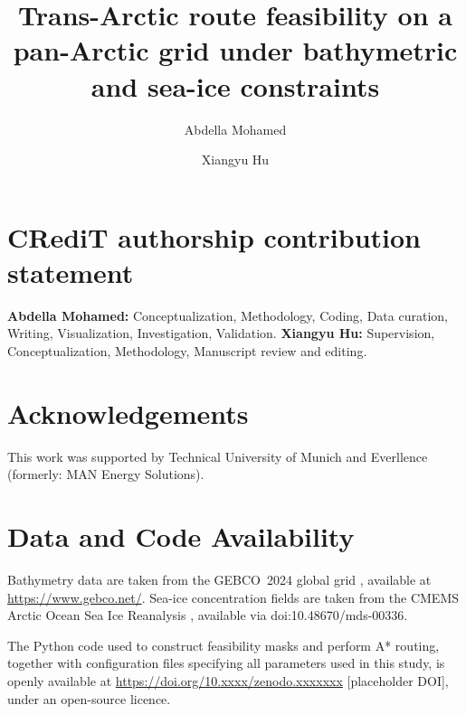 \documentclass[preprint,12pt,authoryear]{elsarticle}
\begin{document}
\doublespacing
\acresetall
\title{Trans-Arctic route feasibility on a pan-Arctic grid under bathymetric and sea-ice constraints}
\author[label1,label2]{Abdella Mohamed}

\author[label1]{Xiangyu Hu}








\section*{CRediT authorship contribution statement}
\textbf{Abdella Mohamed:} Conceptualization, Methodology, Coding, Data curation, Writing, Visualization, Investigation, Validation. 
\textbf{Xiangyu Hu:} Supervision, Conceptualization, Methodology, Manuscript review and editing. 
\section*{Acknowledgements}
This work was supported by Technical University of Munich and Everllence (formerly: MAN Energy Solutions).

\section*{Data and Code Availability}

Bathymetry data are taken from the GEBCO~2024 global grid
\citep{GEBCO2024}, available at \url{https://www.gebco.net/}.
Sea-ice concentration fields are taken from the CMEMS Arctic Ocean Sea Ice
Reanalysis \citep{CMEMS_SeaIce_Reanalysis}, available via doi:10.48670/mds-00336.

The Python code used to construct feasibility masks and perform A* routing,
together with configuration files specifying all parameters used in this
study, is openly available at \url{https://doi.org/10.xxxx/zenodo.xxxxxxx}
[placeholder DOI], under an open-source licence.
\end{document}

